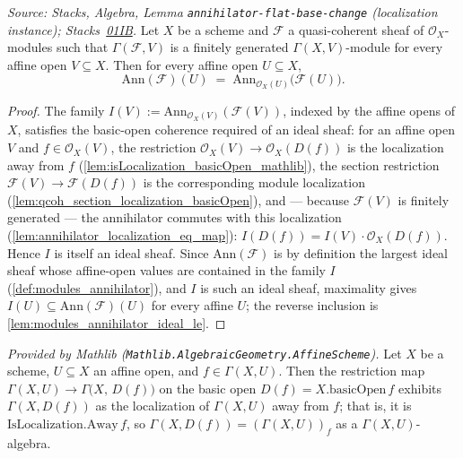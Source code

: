 \begin{lemma}\leanok
  \label{lem:modules_annihilator_ideal}
  \textit{Source: Stacks, Algebra, Lemma \texttt{annihilator-flat-base-change}
  (localization instance);
  Stacks~\href{https://stacks.math.columbia.edu/tag/01IB}{01IB}.}
  Let \(X\) be a scheme and \(\mathcal{F}\) a quasi-coherent sheaf of
  \(\mathcal{O}_X\)-modules such that \(\Gamma(\mathcal{F}, V)\) is a finitely
  generated \(\Gamma(X, V)\)-module for every affine open \(V \subseteq X\).
  Then for every affine open \(U \subseteq X\),
  \[
    \mathrm{Ann}(\mathcal{F})(U)
    \;=\; \mathrm{Ann}_{\mathcal{O}_X(U)}\bigl(\mathcal{F}(U)\bigr).
  \]
\end{lemma}
\begin{proof}\leanok
  The family \(I(V) := \mathrm{Ann}_{\mathcal{O}_X(V)}(\mathcal{F}(V))\),
  indexed by the affine opens of \(X\), satisfies the basic-open coherence
  required of an ideal sheaf: for an affine open \(V\) and
  \(f \in \mathcal{O}_X(V)\), the restriction
  \(\mathcal{O}_X(V) \to \mathcal{O}_X(D(f))\) is the localization away from
  \(f\) (\cref{lem:isLocalization_basicOpen_mathlib}), the section restriction
  \(\mathcal{F}(V) \to \mathcal{F}(D(f))\) is the corresponding module
  localization (\cref{lem:qcoh_section_localization_basicOpen}), and — because
  \(\mathcal{F}(V)\) is finitely generated — the annihilator commutes with this
  localization (\cref{lem:annihilator_localization_eq_map}):
  \(I(D(f)) = I(V) \cdot \mathcal{O}_X(D(f))\).  Hence \(I\) is itself an
  ideal sheaf.  Since \(\mathrm{Ann}(\mathcal{F})\) is by definition the
  largest ideal sheaf whose affine-open values are contained in the family
  \(I\) (\cref{def:modules_annihilator}), and \(I\) is such an ideal sheaf,
  maximality gives \(I(U) \subseteq \mathrm{Ann}(\mathcal{F})(U)\) for every
  affine \(U\); the reverse inclusion is
  \cref{lem:modules_annihilator_ideal_le}.
\end{proof}


\begin{lemma}
  \label{lem:isLocalization_basicOpen_mathlib}
  \mathlibok
  \textit{Provided by Mathlib
  (\texttt{Mathlib.AlgebraicGeometry.AffineScheme}).}
  Let \(X\) be a scheme, \(U \subseteq X\) an affine open, and
  \(f \in \Gamma(X, U)\). Then the restriction map
  \(\Gamma(X, U) \to \Gamma\bigl(X,\, D(f)\bigr)\) on the basic open
  \(D(f) = X.\mathrm{basicOpen}\,f\) exhibits \(\Gamma(X, D(f))\) as the
  localization of \(\Gamma(X, U)\) away from \(f\); that is, it is
  \(\mathrm{IsLocalization.Away}\,f\), so
  \(\Gamma(X, D(f)) = (\Gamma(X, U))_f\) as a \(\Gamma(X,U)\)-algebra.
\end{lemma}


